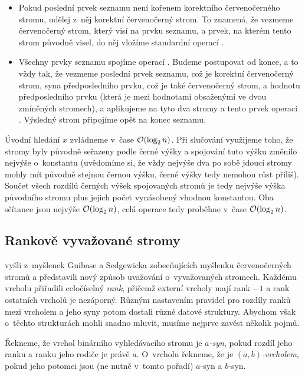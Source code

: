 \begin{enumerate}
\begin{itemize}
\item Pokud poslední prvek seznamu není kořenem korektního červenočerného
stromu, udělej z~něj korektní červenočerný strom. To znamená, že vezmeme
červenočerný strom, který visí na prvku seznamu, a prvek, na kterém tento strom původně
visel, do něj vložíme standardní operací .

\item Všechny prvky seznamu spojíme operací . Budeme postupovat od
konce, a to vždy tak, že vezmeme poslední prvek seznamu, což je korektní
červenočerný strom, syna předposledního prvku, což je také červenočerný strom,
a hodnotu předposledního prvku (která je mezi hodnotami obsaženými ve dvou zmíněných stromech), a aplikujeme na tyto dva stromy
a tento prvek operaci . Výsledný strom připojíme opět na konec
seznamu. 

\end{itemize}
\end{enumerate}

Úvodní hledání $x$ zvládneme v~čase $\o(\log n)$. Při slučování využijeme
toho, že stromy byly původně seřazeny podle černé výšky a spojování tuto výšku
změnilo nejvýše o~konstantu (uvědomíme si, že vždy nejvýše dva po sobě jdoucí
stromy mohly mít původně stejnou černou výšku, černé výšky tedy nemohou růst
příliš). Součet všech rozdílů černých výšek spojovaných stromů je tedy nejvýše
výška původního stromu plus jejich počet vynásobený vhodnou konstantou. Oba sčítance jsou
nejvýše $\o(\log n)$, celá operace  tedy proběhne v~čase $\o(\log
n)$.

\subsection{Rankově vyvažované stromy}

\citet{rankbalanced} vyšli z~myšlenek Guibase a Sedgewicka \citeyearpar{redblack} zobecňujících
myšlenku červenočerných stromů a představili nový způsob uvažování
o~vyvažovaných stromech. Každému vrcholu přiřadili celočíselný \emph{rank}, přičemž
externí vrcholy mají rank $-1$ a rank ostatních vrcholů je nezáporný. Různým
nastavením pravidel pro rozdíly ranků mezi vrcholem a jeho syny potom dostali
různé datové struktury. Abychom však o~těchto strukturách mohli snadno mluvit,
musíme nejprve zavést několik pojmů.

\begin{definice}
Řekneme, že vrchol binárního vyhledávacího stromu je \emph{$a$-syn}, pokud rozdíl jeho ranku a ranku jeho rodiče je právě $a$. O~vrcholu řekneme, že je \emph{$(a,b)$-vrcholem}, pokud jeho potomci jsou (ne nutně v~tomto pořadí) $a$-syn a $b$-syn.
\end{definice}

